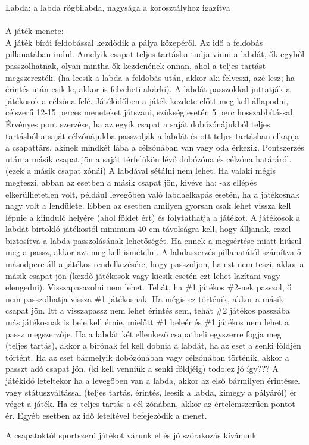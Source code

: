 \documentclass[a4paper, 12pt, twoside, openright]{article}
\begin{document}
\begin{itemize}
Labda: a labda rögbilabda, nagysága a korosztályhoz igazítva\\
\\
A játék menete:\\
A játék bírói feldobással kezdődik a pálya közepéről. Az idő a feldobás pillanatában indul. Amelyik csapat teljes tartásba tudja vinni a labdát, ők egyből passzolhatnak, olyan mintha ők kezdenének onnan, ahol a teljes tartást megszerezték. (ha leesik a labda a feldobás után, akkor aki felveszi, azé lesz; ha érintés után esik le, akkor is felveheti akárki). A labdát passzokkal juttatják a játékosok a célzóna felé.
Játékidőben a játék kezdete előtt meg kell állapodni, célszerű 12-15 perces meneteket játszani, szükség esetén 5 perc hosszabbítással.
Érvényes pont szerzése, ha az egyik csapat a saját dobózónájukból teljes tartásból a saját célzónájukba passzolják a labdát és ott teljes tartásban elkapja a csapattárs, akinek mindkét lába a célzónában van vagy oda érkezik. Pontszerzés után a másik csapat jön a saját térfelükön lévő dobózóna és célzóna határáról. (ezek a másik csapat zónái)
A labdával sétálni nem lehet. Ha valaki mégis megteszi, abban az esetben a másik csapat jön, kivéve ha:
-az ellépés elkerülhetetlen volt, például levegőben való labdaelkapás esetén, ha a játékosnak nagy volt a lendülete. Ebben az esetben amilyen gyorsan csak lehet vissza kell lépnie a kiinduló helyére (ahol földet ért) és folytathatja a játékot. A játékosok a labdát birtokló játékostól minimum 40 cm távolságra kell, hogy álljanak, ezzel biztosítva a labda passzolásának lehetőségét. Ha ennek a megsértése miatt hiúsul meg a passz, akkor azt meg kell ismételni.
A labdaszerzés pillanatától számítva 5 másodperc áll a játékos rendelkezésére, hogy passzoljon, ha ezt nem teszi, akkor a másik csapat jön (kezdő játékosok vagy kicsik esetén ezt lehet lazítani vagy elengedni).
Visszapasazolni nem lehet. Tehát, ha \#1 játékos \#2-nek passzol, ő nem passzolhatja vissza \#1 játékosnak. Ha mégis ez történik, akkor a másik csapat jön.
Itt a visszapassz nem lehet érintés sem, tehát \#2 játékos passzába más játékosnak is bele kell érnie, mielőtt \#1 beleér és \#1 játékos nem lehet a passz megszerzője.
Ha a labdát két ellenkező csapatbeli egyszerre fogja meg (teljes tartás), akkor a bírónak fel kell dobnia a labdát, ha az eset a senki földjén történt. Ha az eset bármelyik dobózónában vagy célzónában történik, akkor a passzt adó csapat jön\footnotemark[\value{footnote}]. (ki kell venniük a senki földjéig) todo:ez jó így???
A játékidő leteltekor ha a levegőben van a labda, akkor az első bármilyen érintéssel vagy státuszváltással (teljes tartás, érintés, leesik a labda, kimegy a pályáról) ér véget a játék. Ha ez teljes tartás a cél zónában, akkor az értelemszerűen pontot ér.
Egyéb esetben az idő leteltével befejeződik a menet.

A csapatoktól sportszerű játékot várunk el és jó szórakozás kívánunk \Smiley

\end{itemize}
\end{document}
